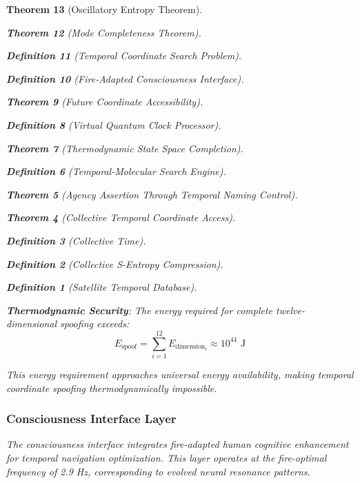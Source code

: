 \documentclass[12pt,a4paper]{article}
\newtheorem{theorem}{Theorem}[section]
\newtheorem{definition}[theorem]{Definition}
\begin{document}
\begin{theorem}[Oscillatory Entropy Theorem]
\begin{theorem}[Mode Completeness Theorem]
\begin{enumerate}
\begin{definition}[Temporal Coordinate Search Problem]
\begin{algorithm}
\begin{definition}[Fire-Adapted Consciousness Interface]
\begin{theorem}[Future Coordinate Accessibility]
\begin{definition}[Virtual Quantum Clock Processor]
\begin{itemize}
\begin{itemize}
\begin{theorem}[Thermodynamic State Space Completion]
\begin{definition}[Temporal-Molecular Search Engine]
\begin{theorem}[Agency Assertion Through Temporal Naming Control]
\begin{remark}
\begin{theorem}[Collective Temporal Coordinate Access]
\begin{definition}[Collective Time]
\begin{definition}[Collective S-Entropy Compression]
\begin{definition}[Satellite Temporal Database]
\begin{algorithm}
\begin{table}[h]
{\begin{enumerate}
\end{enumerate}

\textbf{Thermodynamic Security}: The energy required for complete twelve-dimensional spoofing exceeds:
$$E_{\text{spoof}} = \sum_{i=1}^{12} E_{\text{dimension}_i} \approx 10^{44} \text{ J}$$

This energy requirement approaches universal energy availability, making temporal coordinate spoofing thermodynamically impossible.

\subsubsection{Consciousness Interface Layer}

The consciousness interface integrates fire-adapted human cognitive enhancement for temporal navigation optimization. This layer operates at the fire-optimal frequency of 2.9 Hz, corresponding to evolved neural resonance patterns.

\begin{figure}[h]
\centering
{}
\end{figure}}
\end{table}
\end{algorithm}
\end{definition}
\end{definition}
\end{definition}
\end{theorem}
\end{remark}
\end{theorem}
\end{definition}
\end{theorem}
\end{itemize}
\end{itemize}
\end{definition}
\end{theorem}
\end{definition}
\end{algorithm}
\end{definition}
\end{enumerate}
\end{theorem}
\end{theorem}
\end{document}
